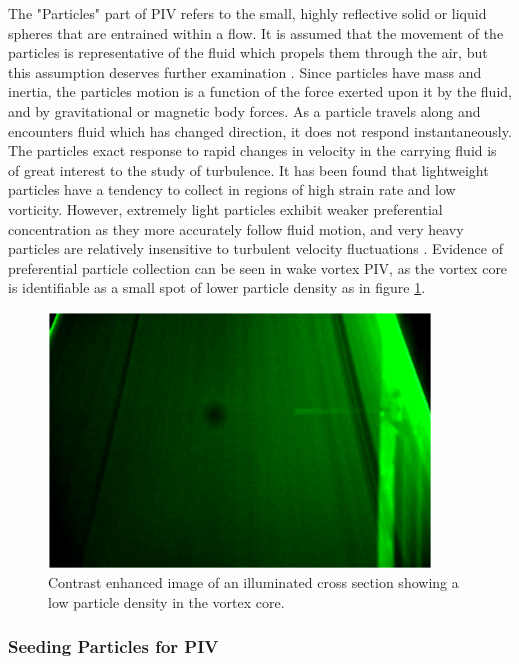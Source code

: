 The "Particles" part of PIV refers to the small, highly reflective solid or 
liquid spheres that are entrained within a flow. It is assumed that the 
movement of the particles is representative of the fluid which propels them 
through the air, but this assumption deserves further examination 
\cite{roscoe1952}. Since particles have mass and inertia, the particles motion 
is a function of the force exerted upon it by the fluid, and by gravitational 
or magnetic body forces. As a particle travels along and encounters fluid which 
has changed direction, it does not respond instantaneously. The particles exact 
response to rapid changes in velocity in the carrying fluid is of great 
interest to the study of turbulence. It has been found that lightweight 
particles have a tendency to collect in regions of high strain rate and low 
vorticity. However, extremely light particles exhibit weaker preferential 
concentration as they more accurately follow fluid motion, and very heavy 
particles are relatively insensitive to turbulent velocity fluctuations 
\cite{squires1990}. Evidence of preferential particle collection can be seen in 
wake vortex PIV, as the vortex core is identifiable as a small spot of lower 
particle density as in figure \ref{fig:vortex_core_particles}.
	
\begin{figure}
	\centering
	\includegraphics[width=4in]{figs/piv_method/vortex_core}
	\caption{Contrast enhanced image of an illuminated cross section showing a 
	low particle density in the vortex core.}
	\label{fig:vortex_core_particles}
\end{figure}



\subsubsection{Seeding Particles for PIV}

